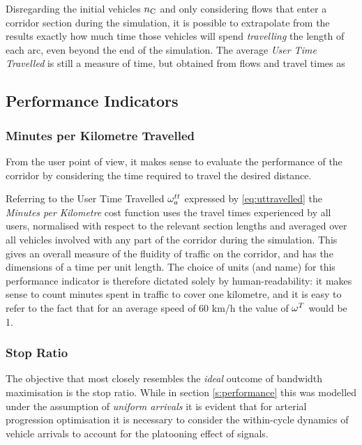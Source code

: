Disregarding the initial vehicles $n_{\mathrm{C}}$ and only considering flows that enter a corridor section during the simulation, it is possible to extrapolate from the results exactly how much time those vehicles will spend \emph{travelling} the length of each arc, even beyond the end of the simulation. The average \emph{User Time Travelled} is still a measure of time, but obtained from flows and travel times as



\subsection{Performance Indicators}

\subsubsection{Minutes per Kilometre Travelled}
From the user point of view, it makes sense to evaluate the performance of the corridor by considering the time required to travel the desired distance.

Referring to the User Time Travelled $\omega_{a}^{tt}$ expressed by \eqref{eq:uttravelled} the \emph{Minutes per Kilometre} cost function
uses the travel times experienced by all users, normalised with respect to the relevant section lengths and averaged over all vehicles involved with any part of the corridor during the simulation. This gives an overall measure of the fluidity of traffic on the corridor, and has the dimensions of a time per unit length. The choice of units (and name) for this performance indicator is therefore dictated solely by human-readability: it makes sense to count minutes spent in traffic to cover one kilometre, and it is easy to refer to the fact that for an average speed of 60 km/h the value of $\omega_{}^{T}$ would be 1.

\subsubsection{Stop Ratio}
The objective that most closely resembles the \emph{ideal} outcome of bandwidth maximisation is the stop ratio. While in section \ref{s:performance} this was modelled under the assumption of \emph{uniform arrivals} it is evident that for arterial progression optimisation it is necessary to consider the within-cycle dynamics of vehicle arrivals to account for the platooning effect of signals.

